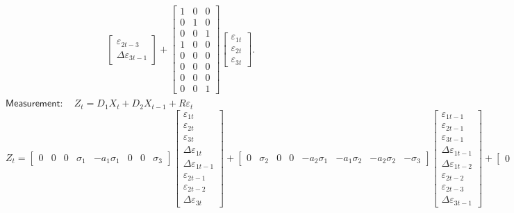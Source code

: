 \documentclass[a4paper,12pt]{article}
\begin{document}
\begin{align}
\begin{bmatrix}
\varepsilon _{2t-3} \\
\Delta \varepsilon _{3t-1}%
\end{bmatrix}%
+%
\begin{bmatrix}
1 & 0 & 0 \\
0 & 1 & 0 \\
0 & 0 & 1 \\
1 & 0 & 0 \\
0 & 0 & 0 \\
0 & 0 & 0 \\
0 & 0 & 0 \\
0 & 0 & 1%
\end{bmatrix}%
\begin{bmatrix}
\varepsilon _{1t} \\
\varepsilon _{2t} \\
\varepsilon _{3t}%
\end{bmatrix}%
.
\end{align}
$\mathsf{Measurement}:\quad
Z_{t}=D_{1}X_{t}+D_{2}X_{t-1}+R\varepsilon _{t}$%
\begin{equation*}
Z_{t}=%
\begin{bmatrix}
0 & 0 & 0 & \sigma _{1} & -a_{1}\sigma _{1} & 0 & 0 & \sigma _{3}%
\end{bmatrix}%
\begin{bmatrix}
\varepsilon _{1t} \\
\varepsilon _{2t} \\
\varepsilon _{3t} \\
\Delta \varepsilon _{1t} \\
\Delta \varepsilon _{1t-1} \\
\varepsilon _{2t-1} \\
\varepsilon _{2t-2} \\
\Delta \varepsilon _{3t}%
\end{bmatrix}%
+%
\begin{bmatrix}
0 & \sigma _{2} & 0 & 0 & -a_{2}\sigma _{1} & -a_{1}\sigma _{2} &
-a_{2}\sigma _{2} & -\sigma _{3}%
\end{bmatrix}%
\begin{bmatrix}
\varepsilon _{1t-1} \\
\varepsilon _{2t-1} \\
\varepsilon _{3t-1} \\
\Delta \varepsilon _{1t-1} \\
\Delta \varepsilon _{1t-2} \\
\varepsilon _{2t-2} \\
\varepsilon _{2t-3} \\
\Delta \varepsilon _{3t-1}%
\end{bmatrix}%
+%
\begin{bmatrix}
0 & 0 & 0%
\end{bmatrix}%
\begin{bmatrix}
\varepsilon _{1t} \\
\varepsilon _{2t} \\
\varepsilon _{3t}%
\end{bmatrix}%
\end{equation*}
$\allowbreak $\EAW
\end{document}
